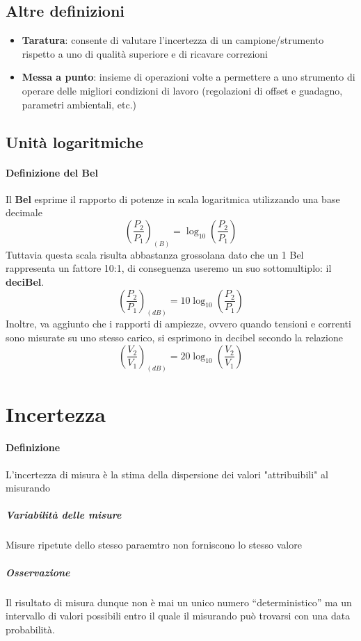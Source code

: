 \documentclass{article}
\begin{document}
	\subsection*{Altre definizioni}
	\begin{itemize}
		\item \textbf{Taratura}: consente di valutare l'incertezza di un campione/strumento rispetto a uno di qualità superiore e di ricavare correzioni
		\item \textbf{Messa a punto}: insieme di operazioni volte a permettere a uno strumento di operare delle migliori condizioni di lavoro (regolazioni di offset e guadagno, parametri ambientali, etc.)
	\end{itemize}

	\subsection*{Unità logaritmiche}
	\paragraph*{Definizione del Bel}
	Il \textbf{Bel} esprime il rapporto di potenze in scala logaritmica utilizzando una base decimale
	\begin{equation}
		\left( \frac{P_2}{P_1} \right)_{(B)} = \log_{10} \left( \frac{P_2}{P_1} \right)
	\end{equation}
	Tuttavia questa scala risulta abbastanza grossolana dato che un 1 Bel rappresenta un fattore 10:1, di conseguenza useremo un suo sottomultiplo: il \textbf{deciBel}.
	\begin{equation}
	\left( \frac{P_2}{P_1} \right)_{(dB)} = 10\log_{10} \left( \frac{P_2}{P_1} \right)
	\end{equation}
	Inoltre, va aggiunto che i rapporti di ampiezze, ovvero quando tensioni e correnti sono misurate su uno stesso carico, si esprimono in decibel secondo la relazione
	\begin{equation}
		\left( \frac{V_2}{V_1} \right)_{(dB)} = 20\log_{10} \left( \frac{V_2}{V_1} \right)
	\end{equation}
	
	\newpage
	\section*{Incertezza}
	\paragraph*{Definizione}
	L'incertezza di misura è la stima della dispersione dei valori "attribuibili" al misurando
	\subparagraph*{Variabilità delle misure}
	Misure ripetute dello stesso paraemtro non forniscono lo stesso valore
	\subparagraph*{Osservazione}
	Il risultato di misura dunque non è mai un unico numero “deterministico” ma un intervallo di valori possibili entro il quale il misurando può trovarsi con una data probabilità.
\end{document}
